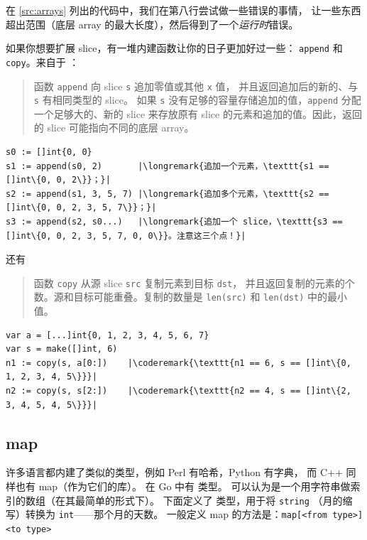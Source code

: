 在 \ref{src:arrays} 列出的代码中，我们在第八行尝试做一些错误的事情，
让一些东西超出范围（底层 array 的最大长度），然后得到了一个\emph{运行时}错误。

如果你想要扩展 slice，有一堆内建函数让你的日子更加好过一些：
\lstinline{append} 和 \lstinline{copy}。来自于 \cite{go_spec}：
\begin{quote}
函数 \lstinline{append} 向 slice \lstinline{s} 追加零值或其他 \lstinline{x} 值，
并且返回追加后的新的、与 \lstinline{s} 有相同类型的 slice。
如果 \lstinline{s} 没有足够的容量存储追加的值，\lstinline{append} 分配一个足够大的、新的 slice
来存放原有 slice 的元素和追加的值。因此，返回的 slice 可能指向不同的底层 array。
\end{quote}
\begin{lstlisting}
s0 := []int{0, 0}
s1 := append(s0, 2)       |\longremark{追加一个元素，\texttt{s1 == []int\{0, 0, 2\}}；}|
s2 := append(s1, 3, 5, 7) |\longremark{追加多个元素，\texttt{s2 == []int\{0, 0, 2, 3, 5, 7\}}；}|
s3 := append(s2, s0...)   |\longremark{追加一个 slice，\texttt{s3 == []int\{0, 0, 2, 3, 5, 7, 0, 0\}}。注意这三个点！}|
\end{lstlisting}
\showremarks
还有
\begin{quote}
函数 \lstinline{copy} 从源 slice \lstinline{src} 复制元素到目标 \lstinline{dst}，
并且返回复制的元素的个数。源和目标可能重叠。复制的数量是 \lstinline{len(src)} 和
\mbox{\lstinline{len(dst)}} 中的最小值。
\end{quote}
\begin{lstlisting}
var a = [...]int{0, 1, 2, 3, 4, 5, 6, 7}
var s = make([]int, 6)
n1 := copy(s, a[0:])    |\coderemark{\texttt{n1 == 6, s == []int\{0, 1, 2, 3, 4, 5\}}}|
n2 := copy(s, s[2:])    |\coderemark{\texttt{n2 == 4, s == []int\{2, 3, 4, 5, 4, 5\}}}|
\end{lstlisting}

\subsection{map}
\label{sec:maps}
许多语言都内建了类似的类型，例如 Perl 有哈希，Python 有字典，
而 C++ 同样也有 map（作为它们的库）。 
在 Go 中有  类型。 
可以认为是一个用字符串做索引的数组（在其最简单的形式下）。
下面定义了  类型，用于将 \lstinline{string} （月的缩写）转换为 \lstinline{int}——那个月的天数。 
一般定义 map 的方法是：\verb|map[<from type>]<to type>|

